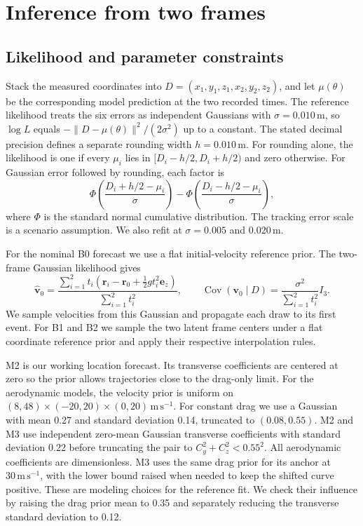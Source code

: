 \section{Inference from two frames}\label{sec:inference}

\subsection{Likelihood and parameter constraints}
Stack the measured coordinates into $D=(x_1,y_1,z_1,x_2,y_2,z_2)$, and let $\mu(\theta)$ be the corresponding model prediction at the two recorded times. The reference likelihood treats the six errors as independent Gaussians with $\sigma=0.010\,\mathrm{m}$, so $\log L$ equals $-\|D-\mu(\theta)\|^2/(2\sigma^2)$ up to a constant. The stated decimal precision defines a separate rounding width $h=0.010\,\mathrm{m}$. For rounding alone, the likelihood is one if every $\mu_i$ lies in $[D_i-h/2,D_i+h/2)$ and zero otherwise. For Gaussian error followed by rounding, each factor is
\[
\Phi\!\left(\frac{D_i+h/2-\mu_i}{\sigma}\right)-
\Phi\!\left(\frac{D_i-h/2-\mu_i}{\sigma}\right),
\]
where $\Phi$ is the standard normal cumulative distribution. The tracking error scale is a scenario assumption. We also refit at $\sigma=0.005$ and $0.020\,\mathrm{m}$.

For the nominal B0 forecast we use a flat initial-velocity reference prior. The two-frame Gaussian likelihood gives
\[
\widehat{\mathbf v}_0=\frac{\sum_{i=1}^2 t_i(\mathbf r_i-\mathbf r_0+\tfrac12gt_i^2\mathbf e_z)}{\sum_{i=1}^2 t_i^2},
\qquad
\operatorname{Cov}(\mathbf v_0\mid D)=\frac{\sigma^2}{\sum_{i=1}^2 t_i^2}I_3.
\]
We sample velocities from this Gaussian and propagate each draw to its first event. For B1 and B2 we sample the two latent frame centers under a flat coordinate reference prior and apply their respective interpolation rules.

M2 is our working location forecast. Its transverse coefficients are centered at zero so the prior allows trajectories close to the drag-only limit. For the aerodynamic models, the velocity prior is uniform on $(8,48)\times(-20,20)\times(0,20)\,\mathrm{m\,s^{-1}}$. For constant drag we use a Gaussian with mean 0.27 and standard deviation 0.14, truncated to $(0.08,0.55)$. M2 and M3 use independent zero-mean Gaussian transverse coefficients with standard deviation 0.22 before truncating the pair to $C_y^2+C_z^2<0.55^2$. All aerodynamic coefficients are dimensionless. M3 uses the same drag prior for its anchor at $30\,\mathrm{m\,s^{-1}}$, with the lower bound raised when needed to keep the shifted curve positive. These are modeling choices for the reference fit. We check their influence by raising the drag prior mean to 0.35 and separately reducing the transverse standard deviation to 0.12.

